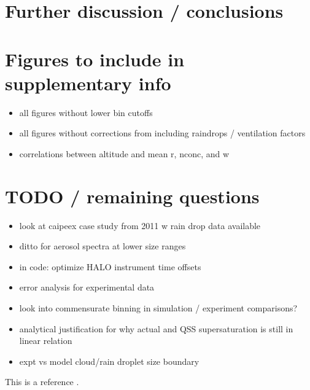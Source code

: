 \documentclass{article}
\begin{document}
\section{Further discussion / conclusions}

\section{Figures to include in supplementary info}
\begin{itemize}
	\item all figures without lower bin cutoffs
	\item all figures without corrections from including raindrops / ventilation factors
	\item correlations between altitude and mean r, nconc, and w
\end{itemize}
\section{TODO / remaining questions}
\begin{itemize}
	\item look at caipeex case study from 2011 w rain drop data available
	\item ditto for aerosol spectra at lower size ranges
	\item in code: optimize HALO instrument time offsets
	\item error analysis for experimental data
	\item look into commensurate binning in simulation / experiment comparisons?
	\item analytical justification for why actual and QSS supersaturation is still in linear relation
	\item expt vs model cloud/rain droplet size boundary
\end{itemize}
This is a reference \cite{Fan2018}.



\end{document}
